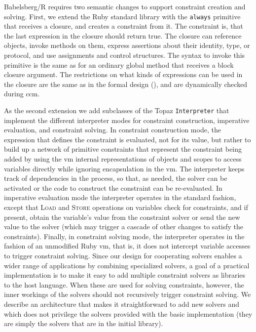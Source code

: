 Babelsberg/R requires two semantic changes to support constraint creation and
solving. First, we extend the Ruby standard library with the \lstinline{always}
primitive that receives a closure, and creates a constraint from it. The
constraint is, that the last expression in the closure should return true. The
closure can reference objects, invoke methods on them, express assertions about
their identity, type, or protocol, and use assignments and control
structures. The syntax to invoke this primitive is the same as for an ordinary
global method that receives a block closure argument. The restrictions on what
kinds of expressions can be used in the closure are the same as in the formal
design (), and are
dynamically checked during \gls{ccm}.

As the second extension we add subclasses of the Topaz \lstinline{Interpreter}
that implement the different interpreter modes for constraint construction,
imperative evaluation, and constraint solving. In constraint construction mode,
the expression that defines the constraint is evaluated, not for its value, but
rather to build up a network of primitive constraints that represent the
constraint being added by using the \ac{vm} internal representations of objects
and scopes to access variables directly while ignoring encapsulation in the
\ac{vm}. The interpreter keeps track of dependencies in the process, so that, as
needed, the solver can be activated or the code to construct the constraint can
be re-evaluated. In imperative evaluation mode the interpreter operates in the
standard fashion, except that \textsc{Load} and \textsc{Store} operations on
variables check for constraints, and if present, obtain the variable's value
from the constraint solver or send the new value to the solver (which may
trigger a cascade of other changes to satisfy the constraints). Finally, in
constraint solving mode, the interpreter operates in the fashion of an
unmodified Ruby \ac{vm}, that is, it does not intercept variable accesses to
trigger constraint solving. Since our design for cooperating solvers enables a
wider range of applications by combining specialized solvers, a goal of a
practical implementation is to make it easy to add multiple constraint solvers
as libraries to the host language. When these are used for solving constraints,
however, the inner workings of the solvers should not recursively trigger
constraint solving. We describe an architecture that makes it straightforward to
add new solvers and which does not privilege the solvers provided with the basic
implementation (they are simply the solvers that are in the initial library).

